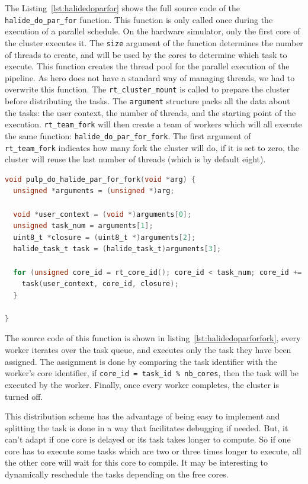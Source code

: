     The Listing~\ref{lst:halidedoparfor} shows the full source code of the \texttt{halide\_do\_par\_for} function.
    This function is only called once during the execution of a parallel schedule. On the hardware simulator, only the first core of the cluster executes it.
    The \texttt{size} argument of the function determines the number of threads to create, and will be used by the cores to determine which task to execute. 
    This function creates the thread pool for the parallel execution of the pipeline. As \gls{hero} does not have a standard way of managing threads, we had to overwrite this function.
    The \texttt{rt\_cluster\_mount} is called to prepare the cluster before distributing the tasks.
    The \texttt{argument} structure packs all the data about the tasks: the user context,  the number of threads, and the starting point of the execution.
    \texttt{rt\_team\_fork} will then create a team of workers which will all execute the same function: \texttt{halide\_do\_par\_for\_fork}.
    The first argument of \texttt{rt\_team\_fork} indicates how many fork the cluster will do, if it is set to zero, the cluster will reuse the last number of threads (which is by default eight).



\begin{lstlisting}[language=C,caption={The \texttt{halide\_do\_par\_for\_fork} function.},label={lst:halidedoparforfork},captionpos=b]
void pulp_do_halide_par_for_fork(void *arg) {
  unsigned *arguments = (unsigned *)arg;

  void *user_context = (void *)arguments[0];
  unsigned task_num = arguments[1];
  uint8_t *closure = (uint8_t *)arguments[2];
  halide_task_t task = (halide_task_t)arguments[3];

  for (unsigned core_id = rt_core_id(); core_id < task_num; core_id += (int)&__rt_nb_pe) {
    task(user_context, core_id, closure);
  }

}
\end{lstlisting}
    The source code of this function is shown in listing~\ref{lst:halidedoparforfork}, every worker iterates over the task queue, and executes only the task they have been assigned.
    The assignment is done by comparing the task identifier with the worker's core identifier, if \texttt{core\_id = task\_id \% nb\_cores}, then the task will be executed by the worker. 
    Finally, once every worker completes, the cluster is turned off.

    
    This distribution scheme has the advantage of being easy to implement and splitting the task is done in a way that facilitates debugging if needed.
    But, it can't adapt if one core is delayed or its task takes longer to compute.
So if one core has to execute some tasks which are two or three times longer to execute, all the other core will wait for this core to compile.
    It may be interesting to dynamically reschedule the tasks depending on the free cores.

